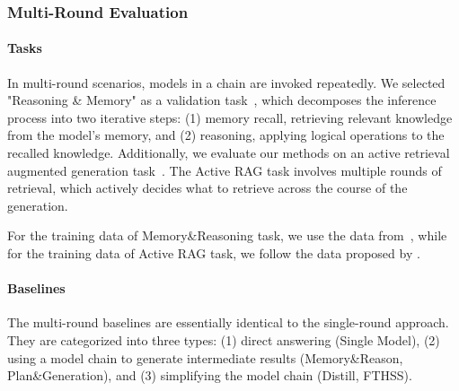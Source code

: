 \subsubsection{Multi-Round Evaluation}
\paragraph{Tasks}

In multi-round scenarios, models in a chain are invoked repeatedly. We selected "Reasoning \& Memory" as a validation task~\cite{jin2024disentangling}, which decomposes the inference process into two iterative steps: (1) memory recall, retrieving relevant knowledge from the model's memory, and (2) reasoning, applying logical operations to the recalled knowledge. Additionally, we evaluate our methods on an active retrieval augmented generation task~\cite{jiang2023active}. The Active RAG task involves multiple rounds of retrieval, which actively decides what to retrieve across the course of the generation.

For the training data of Memory\&Reasoning task, we use the data from~\citet{jin2024disentangling}, while for the training data of Active RAG task, we follow the data proposed by \citet{lyu2024retrieve}.



\paragraph{Baselines}
The multi-round baselines are essentially identical to the single-round approach. They are categorized into three types: (1) direct answering (Single Model), (2) using a model chain to generate intermediate results (Memory\&Reason, Plan\&Generation), and (3) simplifying the model chain (Distill, FTHSS). 

